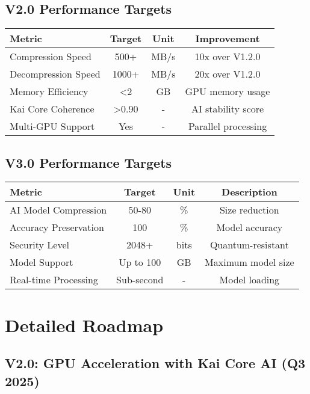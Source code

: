 \documentclass[12pt,a4paper]{article}
\begin{document}
\subsection{V2.0 Performance Targets}
\begin{center}
\begin{tabular}{|l|c|c|c|}
\hline
\textbf{Metric} & \textbf{Target} & \textbf{Unit} & \textbf{Improvement} \\
\hline
Compression Speed & 500+ & MB/s & 10x over V1.2.0 \\
Decompression Speed & 1000+ & MB/s & 20x over V1.2.0 \\
Memory Efficiency & <2 & GB & GPU memory usage \\
Kai Core Coherence & >0.90 & - & AI stability score \\
Multi-GPU Support & Yes & - & Parallel processing \\
\hline
\end{tabular}
\end{center}

\subsection{V3.0 Performance Targets}
\begin{center}
\begin{tabular}{|l|c|c|c|}
\hline
\textbf{Metric} & \textbf{Target} & \textbf{Unit} & \textbf{Description} \\
\hline
AI Model Compression & 50-80 & \% & Size reduction \\
Accuracy Preservation & 100 & \% & Model accuracy \\
Security Level & 2048+ & bits & Quantum-resistant \\
Model Support & Up to 100 & GB & Maximum model size \\
Real-time Processing & Sub-second & - & Model loading \\
\hline
\end{tabular}
\end{center}

\newpage

\section{Detailed Roadmap}

\subsection{V2.0: GPU Acceleration with Kai Core AI (Q3 2025)}
\end{document}
